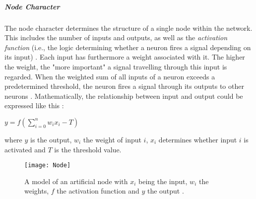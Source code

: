 \documentclass[draft,final]{vutinfth} %
\begin{document}
\subparagraph{Node Character} The node character determines the structure of a single node within the network. This includes the number of inputs and outputs, as well as the \emph{activation function} (i.e., the logic determining whether a neuron fires a signal depending on its input) \cite{wu2018development}. Each input has furthermore a weight associated with it. The higher the weight, the "more important" a signal travelling through this input is regarded. When the weighted sum of all inputs of a neuron exceeds a predetermined threshold, the neuron fires a signal through its outputs to other neurons \cite{zou2009overview}. Mathematically, the relationship between input and output could be expressed like this \cite{mcculloch1943logical}:
\begin{center}
$y=f(\sum_{i=0}^n w_i x_i - T)$
\end{center}
where $y$ is the output, $w_i$ the weight of input $i$, $x_i$ determines whether input $i$ is activated and $T$ is the threshold value.\\
\begin{figure}
\begin{center}
\texttt{[image: Node]}
\end{center}
\caption{A model of an artificial node with $x_i$ being the input, $w_i$ the weights, $f$ the activation function and $y$ the output \cite{zou2009overview}.}
\end{figure}
\end{document}
